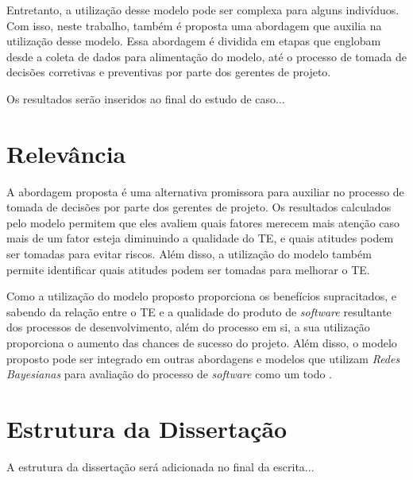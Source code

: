 Entretanto, a utilização desse modelo pode ser complexa para alguns indivíduos. Com isso, neste trabalho, também é proposta uma abordagem que auxilia na utilização desse modelo. Essa abordagem é dividida em etapas que englobam desde a coleta de dados para alimentação do modelo, até o processo de tomada de decisões corretivas e preventivas por parte dos gerentes de projeto.

{\color{red} Os resultados serão inseridos ao final do estudo de caso...}

\section{Relevância}
\label{introducao:relevancia}

A abordagem proposta é uma alternativa promissora para auxiliar no processo de tomada de decisões por parte dos gerentes de projeto. Os resultados calculados pelo modelo permitem que eles avaliem quais fatores merecem mais atenção caso mais de um fator esteja diminuindo a qualidade do TE, e quais atitudes podem ser tomadas para evitar riscos. Além disso, a utilização do modelo também permite identificar quais atitudes podem ser tomadas para melhorar o TE.

Como a utilização do modelo proposto proporciona os benefícios supracitados, e sabendo da relação entre o TE e a qualidade do produto de \textit{software} resultante dos processos de desenvolvimento, além do processo em si, a sua utilização proporciona o aumento das chances de sucesso do projeto. Além disso, o modelo proposto pode ser integrado em outras abordagens e modelos que utilizam \textit{Redes Bayesianas} para avaliação do processo de \textit{software} como um todo \cite{perkusich2014} \cite{perkusich2013}.

\section{Estrutura da Dissertação}
\label{introducao:estrutura}

{\color{red} A estrutura da dissertação será adicionada no final da escrita...}
